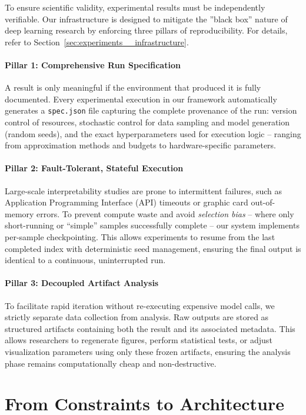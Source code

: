 To ensure scientific validity, experimental results must be independently verifiable. Our infrastructure is designed to mitigate the ''black box'' nature of deep learning research by enforcing three pillars of reproducibility. For details, refer to Section~\ref{sec:experiments__infrastructure}.

\paragraph{Pillar 1: Comprehensive Run Specification}
A result is only meaningful if the environment that produced it is fully documented. Every experimental execution in our framework automatically generates a \texttt{spec.json} file capturing the complete provenance of the run: version control of resources, stochastic control for data sampling and model generation (random seeds), and the exact hyperparameters used for execution logic -- ranging from approximation methods and budgets to hardware-specific parameters.

\paragraph{Pillar 2: Fault-Tolerant, Stateful Execution}
Large-scale interpretability studies are prone to intermittent failures, such as Application Programming Interface (API) timeouts or graphic card out-of-memory errors. To prevent compute waste and avoid \textit{selection bias} -- where only short-running or ``simple'' samples successfully complete -- our system implements per-sample checkpointing. This allows experiments to resume from the last completed index with deterministic seed management, ensuring the final output is identical to a continuous, uninterrupted run.

\paragraph{Pillar 3: Decoupled Artifact Analysis}
To facilitate rapid iteration without re-executing expensive model calls, we strictly separate data collection from analysis. Raw outputs are stored as structured artifacts containing both the result and its associated metadata. This allows researchers to regenerate figures, perform statistical tests, or adjust visualization parameters using only these frozen artifacts, ensuring the analysis phase remains computationally cheap and non-destructive.

\section{From Constraints to Architecture}

